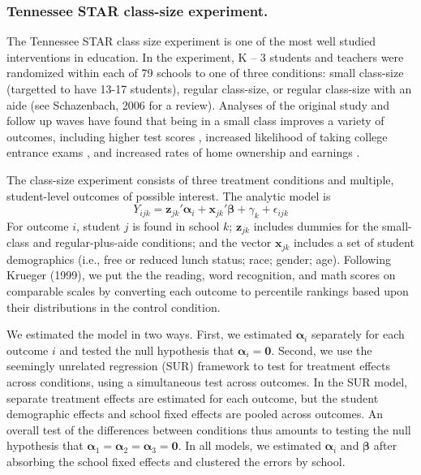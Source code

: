 \documentclass[12pt]{article}\usepackage[]{graphicx}\usepackage[]{color}
\newcommand{\bm}{\mathbf}
\newcommand{\bs}{\boldsymbol}
\begin{document}
\subsubsection{Tennessee STAR class-size experiment.} 

The Tennessee STAR class size experiment is one of the most well studied interventions in education.  In the experiment, K – 3 students and teachers were randomized within each of 79 schools to one of three conditions: small class-size (targetted to have 13-17 students), regular class-size, or regular class-size with an aide (see Schazenbach, 2006 for a review). Analyses of the original study and follow up waves have found that being in a small class improves a variety of outcomes, including higher test scores \citep{Schanzenbach2006what}, increased likelihood of taking college entrance exams \citep{Krueger2001effect}, and increased rates of home ownership and earnings \citep{Chetty2011how}. 

The class-size experiment consists of three treatment conditions and multiple, student-level outcomes of possible interest. The analytic model is 
\begin{equation}
Y_{ijk} = \bm{z}_{jk}'\bs\alpha_i + \bm{x}_{jk}'\bs\beta + \gamma_k + \epsilon_{ijk}
\end{equation}
For outcome $i$, student $j$ is found in school $k$; $\bm{z}_{jk}$ includes dummies for the small-class and regular-plus-aide conditions; and the vector $\bm{x}_{jk}$ includes a set of student demographics (i.e., free or reduced lunch status; race; gender; age). Following Krueger (1999), we put the the reading, word recognition, and math scores on comparable scales by converting each outcome to percentile rankings based upon their distributions in the control condition.

We estimated the model in two ways. First, we estimated $\bs\alpha_i$ separately for each outcome $i$ and tested the null hypothesis that $\bs\alpha_i = \bm{0}$. Second, we use the seemingly unrelated regression (SUR) framework to test for treatment effects across conditions, using a simultaneous test across outcomes. In the SUR model, separate treatment effects are estimated for each outcome, but the student demographic effects and school fixed effects are pooled across outcomes. An overall test of the differences between conditions thus amounts to testing the null hypothesis that $\bs\alpha_1 = \bs\alpha_2 = \bs\alpha_3 = \bm{0}$. In all models, we estimated $\bs\alpha_i$ and $\bs\beta$ after absorbing the school fixed effects and clustered the errors by school.
\end{document}
